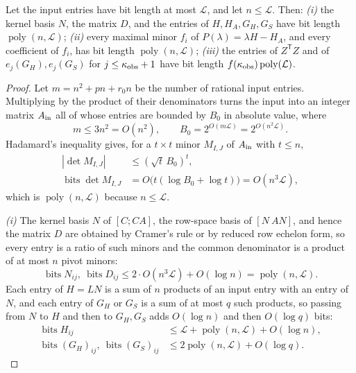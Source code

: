 \begin{lem}\label{lem:coeff}
Let the input entries have bit length at most $\mathcal L$, and let
$n\le\mathcal L$. Then:
\emph{(i)} the kernel basis $N$, the matrix $D$, and the entries of
$H,H_A,G_H,G_S$ have bit length $\operatorname{poly}(n,\mathcal L)$;
\emph{(ii)} every maximal minor $f_i$ of $P(\lambda)=\lambda H-H_A$, and every
coefficient of $f_i$, has bit length $\operatorname{poly}(n,\mathcal L)$;
\emph{(iii)} the entries of $Z^{\mathsf T}Z$ and of $e_j(G_H),e_j(G_S)$ for
$j\le\kappa_{\rm obs}+1$ have bit length
$f(\kappa_{\rm obs})\operatorname{poly}(\mathcal L)$.
\end{lem}

\begin{proof}
Let $m=n^2+pn+r_0n$ be the number of rational input entries. Multiplying by the
product of their denominators turns the input into an integer matrix
$A_{\rm in}$ all of whose entries are bounded by $B_0$ in absolute value, where
\begin{equation*}
m\le3n^2=O(n^2),\qquad B_0=2^{O(m\mathcal L)}=2^{O(n^2\mathcal L)} .
\end{equation*}
Hadamard's inequality gives, for a $t\times t$ minor $M_{I,J}$ of $A_{\rm in}$
with $t\le n$,
\begin{equation*}
\begin{aligned}
|\det M_{I,J}|&\le(\sqrt t\,B_0)^t,\\
\operatorname{bits}\det M_{I,J}
&=O\bigl(t(\log B_0+\log t)\bigr)=O(n^3\mathcal L),
\end{aligned}
\end{equation*}
which is $\operatorname{poly}(n,\mathcal L)$ because $n\le\mathcal L$.

\emph{(i)} The kernel basis $N$ of $[C;CA]$, the row-space basis of $[N\ AN]$,
and hence the matrix $D$ are obtained by Cramer's rule or by reduced row echelon
form, so every entry is a ratio of such minors and the common denominator is a
product of at most $n$ pivot minors:
\begin{equation*}
\operatorname{bits}N_{ij},\ \operatorname{bits}D_{ij}
\le 2\cdot O(n^3\mathcal L)+O(\log n)=\operatorname{poly}(n,\mathcal L).
\end{equation*}
Each entry of $H=LN$ is a sum of $n$ products of an input entry with an entry of
$N$, and each entry of $G_H$ or $G_S$ is a sum of at most $q$ such products, so
passing from $N$ to $H$ and then to $G_H,G_S$ adds $O(\log n)$ and then
$O(\log q)$ bits:
\begin{equation*}
\begin{aligned}
\operatorname{bits}H_{ij}&\le\mathcal L+\operatorname{poly}(n,\mathcal L)+O(\log n),\\
\operatorname{bits}(G_H)_{ij},\ \operatorname{bits}(G_S)_{ij}
&\le2\operatorname{poly}(n,\mathcal L)+O(\log q).
\end{aligned}
\end{equation*}


\end{proof}
